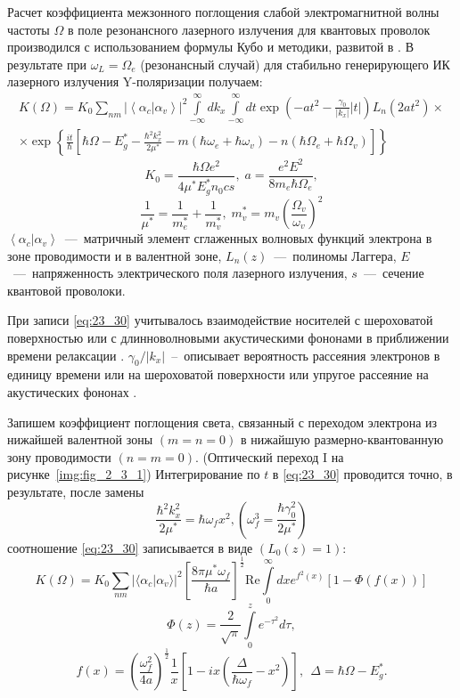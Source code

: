 Расчет коэффициента межзонного поглощения слабой электромагнитной волны частоты $\Omega$ в поле резонансного лазерного излучения для квантовых проволок производился с использованием формулы Кубо \cite{Kubo1957a} и методики, развитой в \cite{Sinyavskii1974}. В результате при $\omega_L = \Omega_e$ (резонансный случай) для стабильно генерирующего ИК лазерного излучения Y-поляризации получаем:
\begin{multline} \label{eq:23_30}
K\left(\Omega\right)=K_0{\sum_{nm}{\left|\left\langle \alpha_c | \alpha_v \right\rangle \right|}}^2 
\int\limits_{-\infty }^{\infty }dk_x \int\limits_{-\infty }^{\infty }{dt \exp{\left( -a t^2 -\frac{\gamma_0 }{\left|k_x\right|}|t| \right) }} L_n\left(2at^2 \right)\times\\
\times {\exp \left\{\frac{it}{\hbar }\left[\hbar \Omega-E^*_g-\frac{\hbar^2 k^2_x}{2\mu^*}-m\left(\hbar\omega_e+\hbar\omega_v\right)-n\left(\hbar\Omega_e + \hbar\Omega_v \right)\right]\right\}\ }
\end{multline}
\[
K_0=\frac{\hbar \Omega e^2}{4\mu^* E_g^* n_0 c s}, \;
a=\frac{e^2 E^2}{8 m_e \hbar\Omega_e},
\]
\[
\frac{1}{{\mu }^*}=\frac{1}{m^*_e}+\frac{1}{m^*_v},\;
m^*_v=m_v {\left(\frac{\Omega_v}{\omega_v}\right)}^2
\] 
$\left\langle \alpha_c | \alpha_v \right\rangle $~---~матричный элемент сглаженных волновых функций электрона в зоне проводимости и в валентной зоне, $L_n\left(z\right)$~---~полиномы Лаггера, $E$~---~напряженность электрического поля лазерного излучения, $s$~---~сечение квантовой проволоки. 

При записи \eqref{eq:23_30} учитывалось взаимодействие носителей с шероховатой поверхностью или с длинноволновыми акустическими фононами в приближении времени релаксации \cite{Khamidullin2002}. ${{\gamma }_0}/{\left|k_x\right|}$~--~описывает вероятность рассеяния электронов в единицу времени или на шероховатой поверхности \cite{Karapetyan2012} или упругое рассеяние на акустических фононах \cite{Khamidullin2006}.

Запишем коэффициент поглощения света, связанный с переходом электрона из нижайшей валентной зоны $(m=n=0)$ в нижайшую размерно-квантованную зону проводимости $(n=m=0)$. (Оптический переход I на рисунке~\ref{img:fig_2_3_1}) Интегрирование по $t$ в  \eqref{eq:23_30} проводится точно, в результате, после замены
\[
\frac{{\hbar }^2 k^2_x}{2\mu^*}=\hbar {\omega }_fx^2, \left({\omega }^3_f = \frac{\hbar {\gamma }^2_0}{2\mu^*}\right)
\] 
соотношение  \eqref{eq:23_30} записывается в виде $\left(L_0\left(z\right)=1\right)$:
\begin{equation} \label{eq:23_40}
K\left(\Omega\right)=K_0\sum_{nm}{ {\lvert\langle \alpha_c | \alpha_v \rangle\rvert}^2 {\left[\frac{8\pi {\mu }^*{\omega }_f}{\hbar a}\right]}^{\frac{1}{2}} \mathrm{Re} \int\limits_{0}^\infty {dx e^{f^2\left(x\right)}\left[1-\Phi \left(f\left(x\right)\right)\right]}}
\end{equation}
\[
\Phi \left(z\right)=\frac{2}{\sqrt{\pi }}\int\limits_{0}^z {e^{-{\tau}^2}}d\tau ,
\] 
\[
f\left(x\right)={\left(\frac{{\omega }^2_f}{4a}\right)}^{\frac{1}{2}}\frac{1}{x}\left[1-ix\left(\frac{\Delta }{\hbar {\omega }_f}-x^2\right)\right],\ \ \Delta =\hbar \Omega-E^*_g .
\] 

